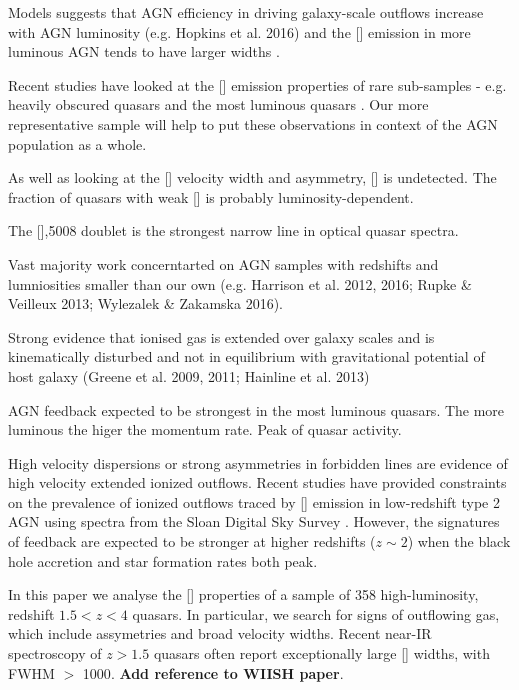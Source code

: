Models suggests that AGN efficiency in driving galaxy-scale outflows increase with AGN luminosity 
(e.g. Hopkins et al. 2016) and the [] emission in more luminous AGN tends to have larger widths \citep[e.g.][]{shen16a,zakamska14,zakamska16}. 

Recent studies have looked at the [] emission properties of rare sub-samples - e.g. heavily obscured quasars \citep{zakamska16} and the most luminous quasars \citep{bischetti16}. 
Our more representative sample will help to put these observations in context of the AGN population as a whole. 

As well as looking at the [] velocity width and asymmetry, [] is undetected. 
The fraction of quasars with weak [] is probably luminosity-dependent. 


The [],5008 doublet is the strongest narrow line in optical quasar spectra.

Vast majority work concerntarted on AGN samples with redshifts and lumniosities smaller than our own (e.g. Harrison et al. 2012, 2016; Rupke \& Veilleux 2013; Wylezalek \& Zakamska 2016).


Strong evidence that ionised gas is extended over galaxy scales and is kinematically disturbed and not in equilibrium with gravitational potential of host galaxy (Greene et al. 2009, 2011; Hainline et al. 2013)

AGN feedback expected to be strongest in the most luminous quasars. 
The more luminous the higer the momentum rate. 
Peak of quasar activity. 

High velocity dispersions or strong asymmetries in forbidden lines are evidence of high velocity extended ionized outflows.
Recent studies have provided constraints on the prevalence of ionized outflows traced by [] emission in low-redshift type 2 AGN \citep[e.g.][]{mullaney13,zakamska14} using spectra from the Sloan Digital Sky Survey \citep[SDSS;][]{york00}. 
However, the signatures of feedback are expected to be stronger at higher redshifts ($z\sim2$) when the black hole accretion and star formation rates both peak. 

In this paper we analyse the [] properties of a sample of 358 high-luminosity, redshift $1.5 < z < 4$ quasars. 
In particular, we search for signs of outflowing gas, which include assymetries and broad velocity widths. 
Recent near-IR spectroscopy of $z>1.5$ quasars often report exceptionally large [] widths, with FWHM $>$ 1000\kms \citep[e.g.][]{netzer04,nesvadba08,kim13,brusa15,carniani15,perna15}. 
{\bf Add reference to WIISH paper}. 


